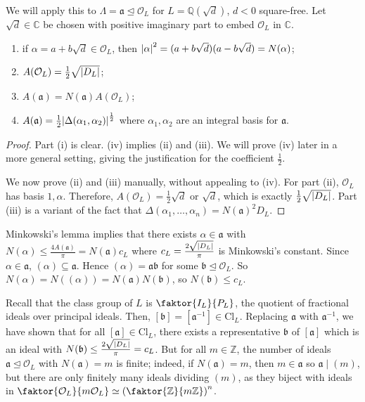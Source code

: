 We will apply this to \( \Lambda = \mathfrak a \trianglelefteq \mathcal O_L \) for \( L = \mathbb Q(\sqrt{d}) \), \( d < 0 \) square-free.
Let \( \sqrt{d} \in \mathbb C \) be chosen with positive imaginary part to embed \( \mathcal O_L \) in \( \mathbb C \).
\begin{lemma}
    \begin{enumerate}
        \item if \( \alpha = a + b \sqrt{d} \in \mathcal O_L \), then \( \abs{\alpha}^2 = (a+b\sqrt{d})(a-b\sqrt{d}) = N(\alpha) \);
        \item \( A(\mathcal O_L) = \frac{1}{2}\sqrt{\abs{D_L}} \);
        \item \( A(\mathfrak a) = N(\mathfrak a) A(\mathcal O_L) \);
        \item \( A(\mathfrak a) = \frac{1}{2} \abs{\Delta(\alpha_1, \alpha_2)}^{\frac{1}{2}} \) where \( \alpha_1, \alpha_2 \) are an integral basis for \( \mathfrak a \).
    \end{enumerate}
\end{lemma}
\begin{proof}
    Part (i) is clear.
    (iv) implies (ii) and (iii).
    We will prove (iv) later in a more general setting, giving the justification for the coefficient \( \frac{1}{2} \).

    We now prove (ii) and (iii) manually, without appealing to (iv).
    For part (ii), \( \mathcal O_L \) has basis \( 1, \alpha \).
    Therefore, \( A(\mathcal O_L) = \frac{1}{2}\sqrt{d} \) or \( \sqrt{d} \), which is exactly \( \frac{1}{2} \sqrt{\abs{D_L}} \).
    Part (iii) is a variant of the fact that \( \Delta(\alpha_1, \dots, \alpha_n) = N(\mathfrak a)^2 D_L \).
\end{proof}
Minkowski's lemma implies that there exists \( \alpha \in \mathfrak a \) with \( N(\alpha) \leq \frac{4A(\mathfrak a)}{\pi} = N(\mathfrak a) c_L \) where \( c_L = \frac{2\sqrt{\abs{D_L}}}{\pi} \) is Minkowski's constant.
Since \( \alpha \in \mathfrak a \), \( (\alpha) \subseteq \mathfrak a \).
Hence \( (\alpha) = \mathfrak a \mathfrak b \) for some \( \mathfrak b \trianglelefteq \mathcal O_L \).
So \( N(\alpha) = N((\alpha)) = N(\mathfrak a) N(\mathfrak b) \), so \( N(\mathfrak b) \leq c_L \).

Recall that the class group of \( L \) is \( \faktor{I_L}{P_L} \), the quotient of fractional ideals over principal ideals.
Then, \( [\mathfrak b] = [\mathfrak a^{-1}] \in \mathrm{Cl}_L \).
Replacing \( \mathfrak a \) with \( \mathfrak a^{-1} \), we have shown that for all \( [\mathfrak a] \in \mathrm{Cl}_L \), there exists a representative \( \mathfrak b \) of \( [\mathfrak a] \) which is an ideal with \( N(\mathfrak b) \leq \frac{2\sqrt{\abs{D_L}}}{\pi} = c_L \).
But for all \( m \in \mathbb Z \), the number of ideals \( \mathfrak a \trianglelefteq \mathcal O_L \) with \( N(\mathfrak a) = m \) is finite; indeed, if \( N(\mathfrak a) = m \), then \( m \in \mathfrak a \) so \( \mathfrak a \mid (m) \), but there are only finitely many ideals dividing \( (m) \), as they biject with ideals in \( \faktor{\mathcal O_L}{m\mathcal O_L} \simeq \qty(\faktor{\mathbb Z}{m\mathbb Z})^n \).

